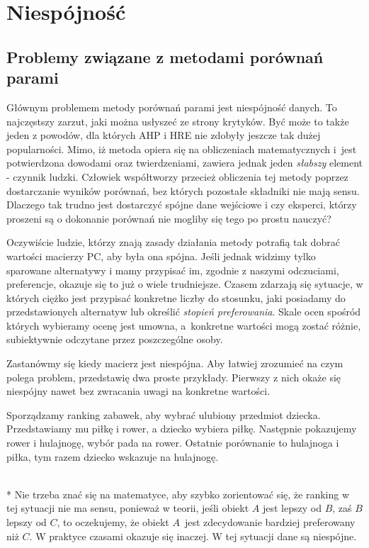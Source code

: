 \chapter{Niespójność}
\label{sec:niespojnosc}
\section{Problemy związane z metodami porównań parami}
\label{subsec:pyoblemu}

Głównym problemem metody porównań parami jest niespójność danych. To najczęstszy zarzut, jaki można usłyszeć ze strony krytyków. Być może to także jeden z powodów, dla których AHP i HRE nie zdobyły jeszcze tak dużej popularności. Mimo, iż metoda opiera się na obliczeniach matematycznych i~jest potwierdzona dowodami oraz twierdzeniami, zawiera jednak jeden \textit{słabszy} element - czynnik ludzki. Człowiek współtworzy przecież obliczenia tej metody poprzez dostarczanie wyników porównań, bez których pozostałe składniki nie mają sensu. Dlaczego tak trudno jest dostarczyć spójne dane wejściowe i czy eksperci, którzy proszeni są o dokonanie porównań nie mogliby się tego po prostu nauczyć?

Oczywiście ludzie, którzy znają zasady działania metody potrafią tak dobrać wartości macierzy PC, aby była ona spójna. Jeśli jednak widzimy tylko sparowane alternatywy i mamy przypisać im, zgodnie z naszymi odczuciami, preferencje, okazuje się to już o wiele trudniejsze. Czasem zdarzają się sytuacje, w których ciężko jest przypisać konkretne liczby do stosunku, jaki posiadamy do przedstawionych alternatyw lub określić \textit{stopień preferowania}. Skale ocen spośród których wybieramy ocenę jest umowna, a~konkretne wartości mogą zostać różnie, subiektywnie odczytane przez poszczególne osoby.
	
Zastanówmy się kiedy macierz jest niespójna. Aby łatwiej zrozumieć na czym polega problem, przedstawię dwa proste przykłady. Pierwszy z nich okaże się niespójny nawet bez zwracania uwagi na konkretne wartości.

\begin{example}Sporządzamy ranking zabawek, aby wybrać ulubiony przedmiot dziecka. Przedstawiamy mu piłkę i rower, a dziecko wybiera piłkę. Następnie pokazujemy rower i hulajnogę, wybór pada na rower. Ostatnie porównanie to hulajnoga i piłka, tym razem dziecko wskazuje na hulajnogę. \end{example}
\\*
Nie trzeba znać się na matematyce, aby szybko zorientować się, że ranking w tej sytuacji nie ma sensu, ponieważ w teorii, jeśli obiekt $A$ jest lepszy od $B$, zaś $B$ lepszy od $C$, to oczekujemy, że obiekt $A$~jest zdecydowanie bardziej preferowany niż $C$. W praktyce czasami okazuje się inaczej. W tej sytuacji dane są niespójne.

